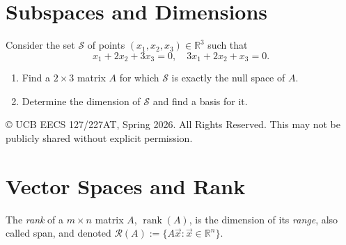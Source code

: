 \documentclass[10pt]{article}
\theoremstyle{definition}
\theoremstyle{plain}
\newcommand{\RR}{\mathbb{R}}
\newcommand{\Range}{\mathcal{R}}
\DeclareMathOperator{\rank}{rank}
\begin{document}
\section{Subspaces and Dimensions}

Consider the set $\mathcal{S}$ of points $(x_1, x_2, x_3) \in \RR^3$ such that
\begin{equation}
    x_1 + 2x_2 + 3x_3 = 0, \quad 3x_1 + 2x_2 + x_3 = 0.
\end{equation}

\begin{enumerate}[label=(\alph*)]
    \item Find a $2 \times 3$ matrix $A$ for which $\mathcal{S}$ is exactly the null space of $A$.
    \item Determine the dimension of $\mathcal{S}$ and find a basis for it.
\end{enumerate}

\vfill
\noindent\footnotesize{\copyright{} UCB EECS 127/227AT, Spring 2026. \scriptsize{All Rights Reserved. This may not be publicly shared without explicit permission.}}

\newpage

\section{Vector Spaces and Rank}

The \textit{rank} of a $m \times n$ matrix $A$, $\rank(A)$, is the dimension of its \textit{range}, also called span, and denoted $\Range(A) := \{A\vec{x} : \vec{x} \in \RR^n\}$.
\end{document}
